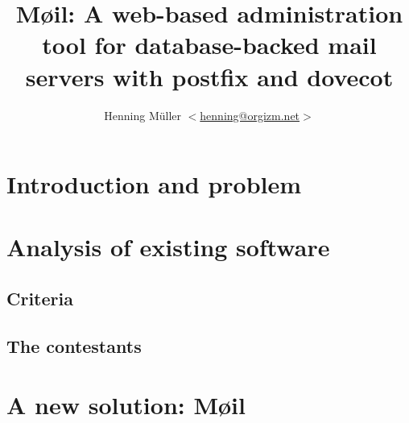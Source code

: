 \documentclass[12pt,a4paper]{scrartcl}
\begin{document}
	\title{Møil: A web-based administration tool for database-backed mail servers with postfix and dovecot}
	\author{
		Henning Müller $<$\href{mailto:henning@orgizm.net}{henning@orgizm.net}$>$
	}
	\date{}

	\maketitle


	\section*{Introduction and problem}

	\section*{Analysis of existing software}

	\subsection*{Criteria}

	\subsection*{The contestants}

	\section*{A new solution: Møil}

	\printbibliography
\end{document}
